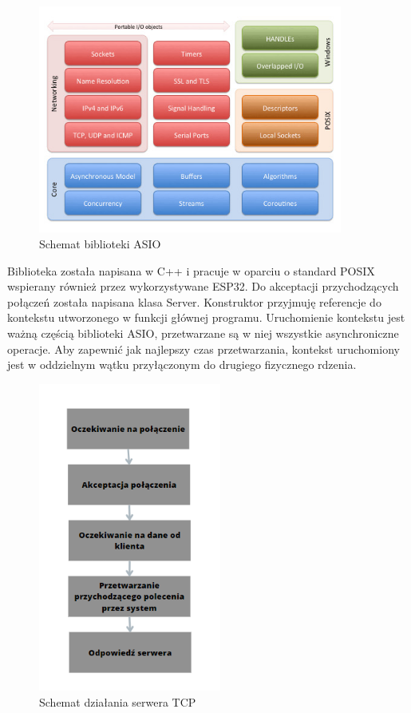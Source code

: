 \begin{figure}[H]
	\centering
	\includegraphics[width=10cm]{pages/robot/zdjecia/schematASIO.jpg}
	\caption{Schemat biblioteki ASIO \cite{asio}}
	\label{Fig:schematASIO}
\end{figure}

Biblioteka została napisana w C++ i pracuje w oparciu o standard POSIX wspierany również przez wykorzystywane ESP32.
Do akceptacji przychodzących połączeń została napisana klasa Server. Konstruktor przyjmuję referencje do kontekstu utworzonego w funkcji głównej programu. 
Uruchomienie kontekstu jest ważną częścią biblioteki ASIO, przetwarzane są w niej wszystkie asynchroniczne operacje.
Aby zapewnić jak najlepszy czas przetwarzania, kontekst uruchomiony jest w oddzielnym wątku przyłączonym do drugiego fizycznego rdzenia.

\begin{figure}[H]
	\centering
	\includegraphics[width=6cm]{pages/robot/zdjecia/schematTCP.png}
	\caption{Schemat działania serwera TCP}
	\label{Fig:schematSerweraTCP}
\end{figure}

